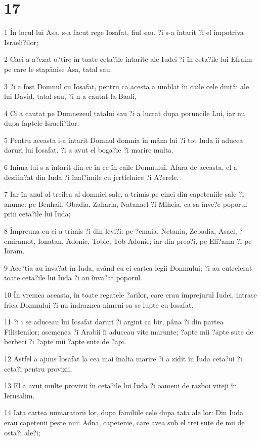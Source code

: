 \chapter{17}

\par 1 În locul lui Asa, s-a facut rege Iosafat, fiul sau. ?i s-a întarit ?i el împotriva Israeli?ilor;
\par 2 Caci a a?ezat o?tire în toate ceta?ile întarite ale Iudei ?i în ceta?ile lui Efraim pe care le stapânise Asa, tatal sau.
\par 3 ?i a fost Domnul cu Iosafat, pentru ca acesta a umblat în caile cele dintâi ale lui David, tatal sau, ?i n-a cautat la Baali,
\par 4 Ci a cautat pe Dumnezeul tatalui sau ?i a lucrat dupa poruncile Lui, iar nu dupa faptele Israeli?ilor.
\par 5 Pentru aceasta i-a întarit Domnul domnia în mâna lui ?i tot Iuda îi aducea daruri lui Iosafat, ?i a avut el boga?ie ?i marire multa.
\par 6 Inima lui s-a întarit din ce în ce în caile Domnului. Afara de aceasta, el a desfiin?at din Iuda ?i înal?imile cu jertfelnice ?i A?erele.
\par 7 Iar în anul al treilea al domniei sale, a trimis pe cinci din capeteniile sale ?i anume: pe Benhail, Obadia, Zaharia, Natanael ?i Miheia, ca sa înve?e poporul prin ceta?ile lui Iuda;
\par 8 Împreuna cu ei a trimis ?i din levi?i: pe ?emaia, Netania, Zebadia, Asael, ?emiramot, Ionatan, Adonie, Tobie, Tob-Adonie; iar din preo?i, pe Eli?ama ?i pe Ioram.
\par 9 Ace?tia au înva?at în Iuda, având cu ei cartea legii Domnului; ?i au cutreierat toate ceta?ile lui Iuda ?i au înva?at poporul.
\par 10 În vremea aceasta, în toate regatele ?arilor, care erau împrejurul Iudei, intrase frica Domnului ?i nu îndraznea nimeni sa se lupte cu Iosafat.
\par 11 ?i i se aduceau lui Iosafat daruri ?i argint ca bir, pâna ?i din partea Filistenilor; asemenea ?i Arabii îi aduceau vite marunte; ?apte mii ?apte sute de berbeci ?i ?apte mii ?apte sute de ?api.
\par 12 Astfel a ajuns Iosafat la cea mai înalta marire ?i a zidit în Iuda ceta?ui ?i ceta?i pentru provizii.
\par 13 El a avut multe provizii în ceta?ile lui Iuda ?i oameni de razboi viteji în Ierusalim.
\par 14 Iata cartea numaratorii lor, dupa familiile cele dupa tata ale lor: Din Iuda erau capetenii peste mii: Adna, capetenie, care avea sub el trei sute de mii de osta?i ale?i;
